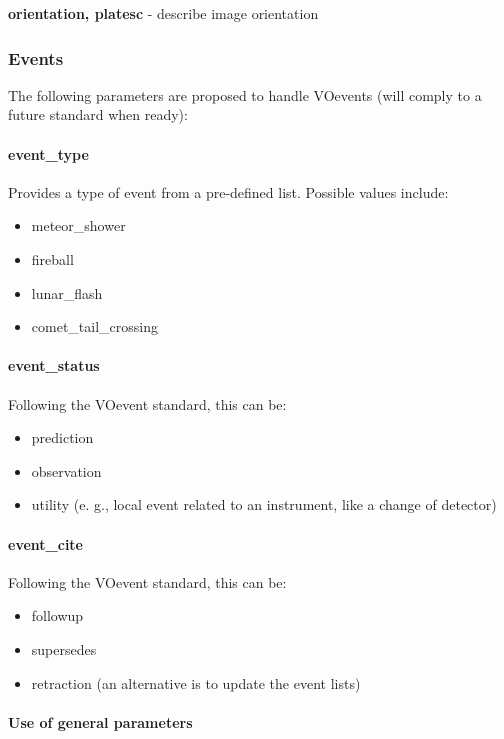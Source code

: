\documentclass[11pt,a4paper]{ivoa}
\begin{document}
\textbf{orientation, platesc} - describe image orientation

\subsubsection{Events}

The following parameters are proposed to handle VOevents (will comply to a future standard when ready):

\paragraph{event\_type}

Provides a type of event from a pre-defined list. Possible values include:

\begin{itemize}
\item meteor\_shower
\item fireball
\item lunar\_flash
\item comet\_tail\_crossing
\end{itemize}

\paragraph{event\_status}

Following the VOevent standard, this can be:

\begin{itemize}
\item prediction
\item observation
\item utility (e. g., local event related to an instrument, like a change of detector)
\end{itemize}

\paragraph{event\_cite}

Following the VOevent standard, this can be:

\begin{itemize}
\item followup
\item supersedes
\item retraction (an alternative is to update the event lists)
\end{itemize}

\paragraph{Use of general parameters\textbf{ }}
\end{document}
